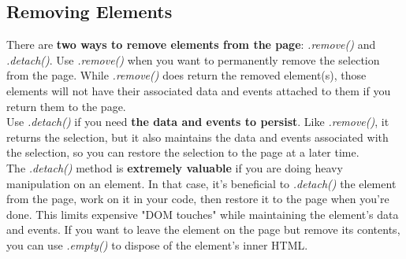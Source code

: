\documentclass[10pt,letterpaper]{report}
\begin{document}
\subsection{Removing Elements}
There are \textbf{two ways to remove elements from the page}: \textit{.remove()} and \textit{.detach()}. Use \textit{.remove()} when you want to permanently remove the selection from the page. While \textit{.remove()} does return the removed element(s), those elements will not have their associated data and events attached to them if you return them to the page.\\
Use \textit{.detach()} if you need \textbf{the data and events to persist}. Like \textit{.remove()}, it returns the selection, but it also maintains the data and events associated with the selection, so you can restore the selection to the page at a later time.\\
The \textit{.detach()} method is \textbf{extremely valuable} if you are doing heavy manipulation on an element. In that case, it's beneficial to \textit{.detach()} the element from the page, work on it in your code, then restore it to the page when you're done. This limits expensive "DOM touches" while maintaining the element's data and events.
If you want to leave the element on the page but remove its contents, you can use \textit{.empty()} to dispose of the element's inner HTML.
\end{document}
